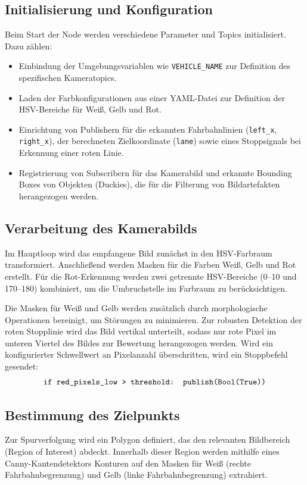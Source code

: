 \subsection{Initialisierung und Konfiguration}
Beim Start der Node werden verschiedene Parameter und Topics initialisiert. Dazu zählen:
\begin{itemize}
    \item Einbindung der Umgebungsvariablen wie \texttt{VEHICLE\_NAME} zur Definition des spezifischen Kameratopics.
    \item Laden der Farbkonfigurationen aus einer YAML-Datei zur Definition der \ac{HSV}-Bereiche für Weiß, Gelb und Rot.
    \item Einrichtung von Publishern für die erkannten Fahrbahnlinien (\texttt{left\_x}, \texttt{right\_x}), der berechneten Zielkoordinate (\texttt{lane}) sowie eines Stoppsignals bei Erkennung einer roten Linie.
    \item Registrierung von Subscribern für das Kamerabild und erkannte Bounding Boxes von Objekten (Duckies), die für die Filterung von Bildartefakten herangezogen werden.
\end{itemize}

\newpage

\subsection{Verarbeitung des Kamerabilds}
Im Hauptloop wird das empfangene Bild zunächst in den \ac{HSV}-Farbraum transformiert. Anschließend werden Masken für die Farben Weiß, Gelb und Rot erstellt. Für die Rot-Erkennung werden zwei getrennte \ac{HSV}-Bereiche (0--10 und 170--180) kombiniert, um die Umbruchstelle im Farbraum zu berücksichtigen.

Die Masken für Weiß und Gelb werden zusätzlich durch morphologische Operationen bereinigt, um Störungen zu minimieren. Zur robusten Detektion der roten Stopplinie wird das Bild vertikal unterteilt, sodass nur rote Pixel im unteren Viertel des Bildes zur Bewertung herangezogen werden. Wird ein konfigurierter Schwellwert an Pixelanzahl überschritten, wird ein Stoppbefehl gesendet:
\begin{equation}
    \texttt{if red\_pixels\_low > threshold:\quad publish(Bool(True))}
\end{equation}

\subsection{Bestimmung des Zielpunkts}
Zur Spurverfolgung wird ein Polygon definiert, das den relevanten Bildbereich (Region of Interest) abdeckt. Innerhalb dieser Region werden mithilfe eines Canny-Kantendetektors Konturen auf den Masken für Weiß (rechte Fahrbahnbegrenzung) und Gelb (linke Fahrbahnbegrenzung) extrahiert.

